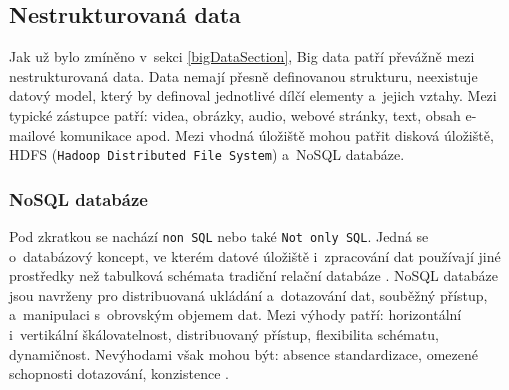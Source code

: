 \subsection{Nestrukturovaná data}
Jak už bylo zmíněno v~sekci \ref{bigDataSection}, Big data patří převážně mezi nestrukturovaná data. Data nemají přesně definovanou strukturu, neexistuje datový model, který by definoval jednotlivé dílčí elementy a~jejich vztahy. Mezi typické zástupce patří: videa, obrázky, audio, webové stránky, text, obsah e-mailové komunikace apod. Mezi vhodná úložiště mohou patřit disková úložiště, HDFS (\texttt{Hadoop Distributed File System}) a~NoSQL databáze.

\subsubsection{NoSQL databáze}
Pod zkratkou se nachází \texttt{non SQL} nebo také \texttt{Not only SQL}. Jedná se o~databázový koncept, ve kterém datové úložiště i~zpracování dat používají jiné prostředky než tabulková schémata tradiční relační databáze \cite{noSqlWiki}. NoSQL databáze jsou navrženy pro distribuovaná ukládání a~dotazování dat, souběžný přístup, a~manipulaci s~obrovským objemem dat. Mezi výhody patří: horizontální i~vertikální škálovatelnost, distribuovaný přístup, flexibilita schématu, dynamičnost. Nevýhodami však mohou být: absence standardizace, omezené schopnosti dotazování, konzistence \cite{noSqlIntro}.

